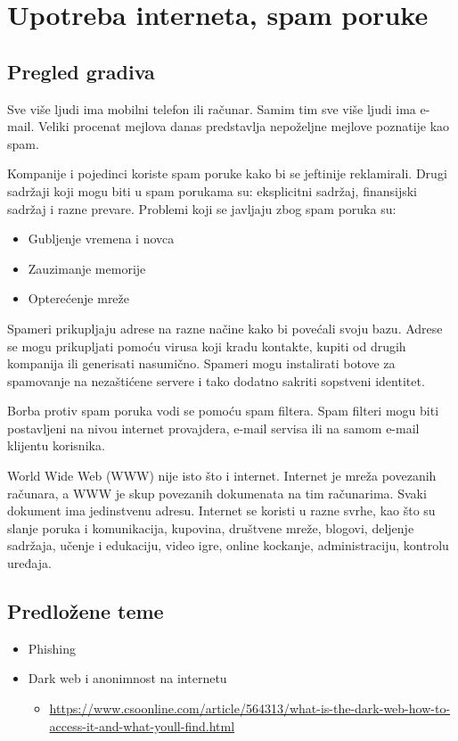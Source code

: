 \documentclass[a4paper,12pt]{article}
\begin{document}
\section{Upotreba interneta, spam poruke}
\subsection{Pregled gradiva}

Sve više ljudi ima mobilni telefon ili računar. Samim tim sve više ljudi ima e-mail. Veliki procenat mejlova danas predstavlja nepoželjne mejlove poznatije kao spam. 

Kompanije i pojedinci koriste spam poruke kako bi se jeftinije reklamirali. Drugi sadržaji koji mogu biti u spam porukama su: eksplicitni sadržaj, finansijski sadržaj i razne prevare. Problemi koji se javljaju zbog spam poruka su:
\begin{itemize}
    \item Gubljenje vremena i novca
    \item Zauzimanje memorije
    \item Opterećenje mreže
\end{itemize}

Spameri prikupljaju adrese na razne načine kako bi povećali svoju bazu. Adrese se mogu prikupljati pomoću virusa koji kradu kontakte, kupiti od drugih kompanija ili generisati nasumično. Spameri mogu instalirati botove za spamovanje na nezaštićene servere i tako dodatno sakriti sopstveni identitet. 

Borba protiv spam poruka vodi se pomoću spam filtera. Spam filteri mogu biti postavljeni na nivou internet provajdera, e-mail servisa ili na samom e-mail klijentu korisnika. 

World Wide Web (WWW) nije isto što i internet. Internet je mreža povezanih računara, a WWW je skup povezanih dokumenata na tim računarima. Svaki dokument ima jedinstvenu adresu. Internet se koristi u razne svrhe, kao što su slanje poruka i komunikacija, kupovina, društvene mreže, blogovi, deljenje sadržaja, učenje i edukaciju, video igre, online kockanje, administraciju, kontrolu uređaja. 

\subsection{Predložene teme}
\begin{itemize}
    \item Phishing
    \item Dark web i anonimnost na internetu
    \begin{itemize}
        \item \small{\href{https://www.csoonline.com/article/564313/what-is-the-dark-web-how-to-access-it-and-what-youll-find.html}{https://www.csoonline.com/article/564313/what-is-the-dark-web-how-to-access-it-and-what-youll-find.html}}
    \end{itemize}
    
\end{itemize}
\end{document}

